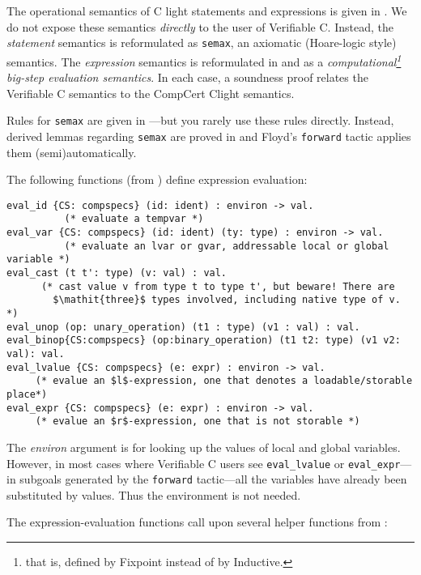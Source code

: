 \documentclass[12pt,fleqn,openany,oneside,showtrims]{memoir}
\begin{document}
The operational semantics of C light statements and expressions
is given in .  We do not expose
these semantics \emph{directly} to the user of Verifiable C.
Instead, the \emph{statement} semantics is reformulated
as \lstinline{semax}, an axiomatic (Hoare-logic style) semantics.
The \emph{expression} semantics is reformulated in
 and  as
a \emph{computational\footnote{that is, defined by \textsf{Fixpoint} instead of
    by \textsf{Inductive}.}
big-step evaluation semantics}.
In each case, a soundness proof relates the Verifiable C semantics
to the CompCert Clight semantics.

Rules for \lstinline{semax} are given in
---but you rarely use
these rules directly.  Instead, derived lemmas regarding
\lstinline{semax} are proved in  and
Floyd's \lstinline{forward} tactic applies them (semi)automatically.

The following functions (from ) define
expression evaluation:
\begin{lstlisting}
eval_id {CS: compspecs} (id: ident) : environ -> val.
          (* evaluate a tempvar *)
eval_var {CS: compspecs} (id: ident) (ty: type) : environ -> val.
          (* evaluate an lvar or gvar, addressable local or global variable *)
eval_cast (t t': type) (v: val) : val.
      (* cast value v from type t to type t', but beware! There are
        $\mathit{three}$ types involved, including native type of v. *)
eval_unop (op: unary_operation) (t1 : type) (v1 : val) : val.
eval_binop{CS:compspecs} (op:binary_operation) (t1 t2: type) (v1 v2: val): val.
eval_lvalue {CS: compspecs} (e: expr) : environ -> val.
     (* evalue an $l$-expression, one that denotes a loadable/storable place*)
eval_expr {CS: compspecs} (e: expr) : environ -> val.
     (* evalue an $r$-expression, one that is not storable *)\end{lstlisting}

The \emph{environ} argument is for looking up the values of
local and global variables.  However, in most cases where
Verifiable C users see \lstinline{eval_lvalue}
or \lstinline{eval_expr}---in subgoals generated by the
\lstinline{forward} tactic---all the variables have already been
substituted by values.  Thus the environment is not needed.

The expression-evaluation functions call upon several helper
functions from :
\end{document}
